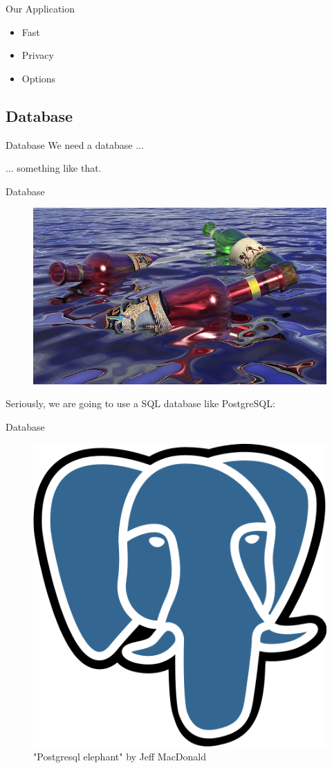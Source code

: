 \begin{frame}{Our Application}
\begin{itemize}
\item Fast
\item Privacy
\item Options
\end{itemize}
\end{frame}

\subsection{Database}
\begin{frame}{Database}
\centering
We need a database ...
\end{frame}

... something like that.

\begin{frame}{Database}
\begin{figure}[!ht]
\centering
\includegraphics[width=0.8\linewidth]{img/bottles.jpg}
\end{figure}
\end{frame}

Seriously, we are going to use a SQL database like
PostgreSQL:

\begin{frame}{Database}
\begin{figure}[!ht]
\centering
\includegraphics[width=0.4\linewidth]{img/postgresql.png}
\caption{"Postgresql elephant" by Jeff MacDonald}
\end{figure}
\end{frame}

